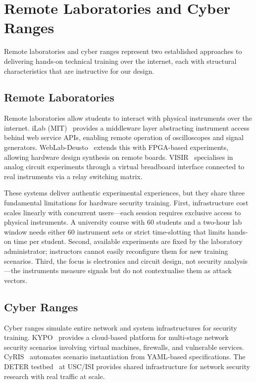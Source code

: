 \section{Remote Laboratories and Cyber Ranges}\label{sec:remote-labs}

Remote laboratories and cyber ranges represent two established approaches to delivering hands-on technical training over the internet, each with structural characteristics that are instructive for our design.

\subsection{Remote Laboratories}\label{subsec:remote-labs-detail}

Remote laboratories allow students to interact with physical instruments over the internet. iLab (MIT)~\cite{ilab2004} provides a middleware layer abstracting instrument access behind web service APIs, enabling remote operation of oscilloscopes and signal generators. WebLab-Deusto~\cite{weblab2005} extends this with FPGA-based experiments, allowing hardware design synthesis on remote boards. VISIR~\cite{visir2006} specialises in analog circuit experiments through a virtual breadboard interface connected to real instruments via a relay switching matrix.

These systems deliver authentic experimental experiences, but they share three fundamental limitations for hardware security training. First, infrastructure cost scales linearly with concurrent users---each session requires exclusive access to physical instruments. A university course with 60 students and a two-hour lab window needs either 60 instrument sets or strict time-slotting that limits hands-on time per student. Second, available experiments are fixed by the laboratory administrator; instructors cannot easily reconfigure them for new training scenarios. Third, the focus is electronics and circuit design, not security analysis---the instruments measure signals but do not contextualise them as attack vectors.

\subsection{Cyber Ranges}\label{subsec:cyber-ranges}

Cyber ranges simulate entire network and system infrastructures for security training. KYPO~\cite{kypo2017} provides a cloud-based platform for multi-stage network security scenarios involving virtual machines, firewalls, and vulnerable services. CyRIS~\cite{cyris2017} automates scenario instantiation from YAML-based specifications. The DETER testbed~\cite{deter2004} at USC/ISI provides shared infrastructure for network security research with real traffic at scale.

